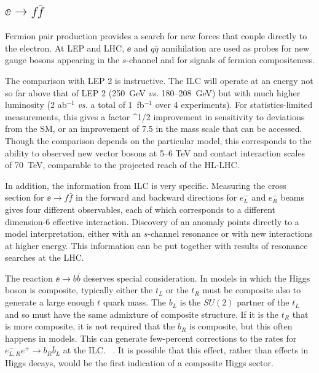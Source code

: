 \subsection{$\ee\to f\bar f$}
\label{subsec:phys_ff}

Fermion pair production provides a search for new forces that couple directly to the electron.   At LEP and LHC, $\ee$ and $q\bar q$ annihilation are used as probes for new gauge bosons appearing in the $s$-channel and for signals of fermion compositeness. 

The comparison with LEP 2 is instructive.   The ILC will operate at an energy not so far above that of LEP 2  (250~GeV {\it vs.}  180--208~GeV)  but with much higher luminosity (2 ab$^{-1}$  {\it vs.} a total of 1~fb$^{-1}$ over 4 experiments).   For statistics-limited measurements, this gives a factor 
\beq
   ^{1/2}  
\eeqn
improvement in sensitivity to deviations from the SM, or an improvement of  7.5 in the mass scale that can be accessed.   Though the comparison depends on the particular model, this corresponds to the ability to observed new vector bosons at 5--6 TeV and 
contact interaction scales of 70~TeV, comparable to  the projected reach of the HL-LHC. 

 In addition, the information from ILC is very specific.   Measuring the cross section for $\ee\to f\bar f$ in the forward and backward directions for $e^-_L$ and $e^-_R$ beams gives four  different observables, each of which corresponds to a different dimension-6 effective  interaction.   Discovery of an anomaly points directly to a model interpretation, either with an $s$-channel resonance or with new interactions at higher energy.   This information can be put together with results of resonance searches at the LHC. 

The reaction $\ee\to b\bar b$ deserves special consideration. In models in which the Higgs boson is composite, typically either the $t_L$ or the $t_R$ must be composite also to generate a large enough $t$ quark mass.    The $b_L$ is the $SU(2)$ partner of the $t_L$ and so must have the same admixture of composite structure.    If it is the $t_R$ that is more composite, it is not required that the $b_R$ is composite, but this often happens in models.  This can generate few-percent corrections to the rates for $e^-_{L,R} e^+\to b_R\bar b_L$ at the ILC.  ~\cite{Funatsu:2017nfm,Yoon:2018xud}.   It is possible that this effect, rather than effects in Higgs decays, would be the first indication of a composite Higgs sector. 

